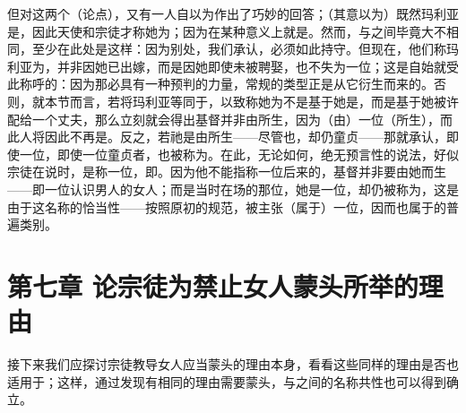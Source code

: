 但对这两个（论点），又有一人自以为作出了巧妙的回答；（其意以为）既然玛利亚是，因此天使和宗徒才称她为；因为在某种意义上就是。然而，与之间毕竟大不相同，至少在此处是这样：因为别处，我们承认，必须如此持守。但现在，他们称玛利亚为，并非因她已出嫁，而是因她即使未被聘娶，也不失为一位；这是自始就受此称呼的：因为那必具有一种预判的力量，常规的类型正是从它衍生而来的。否则，就本节而言，若将玛利亚等同于，以致称她为不是基于她是，而是基于她被许配给一个丈夫，那么立刻就会得出基督并非由所生，因为（由）一位（所生），而此人将因此不再是。反之，若祂是由所生——尽管也，却仍童贞——那就承认，即使一位，即使一位童贞者，也被称为。在此，无论如何，绝无预言性的说法，好似宗徒在说时，是称一位，即。因为他不能指称一位后来的，基督并非要由她而生——即一位认识男人的女人；而是当时在场的那位，她是一位，却仍被称为，这是由于这名称的恰当性——按照原初的规范，被主张（属于）一位，因而也属于的普遍类别。\par


\section{第七章 论宗徒为禁止女人蒙头所举的理由}

接下来我们应探讨宗徒教导女人应当蒙头的理由本身，看看这些同样的理由是否也适用于；这样，通过发现有相同的理由需要蒙头，与之间的名称共性也可以得到确立。\par

